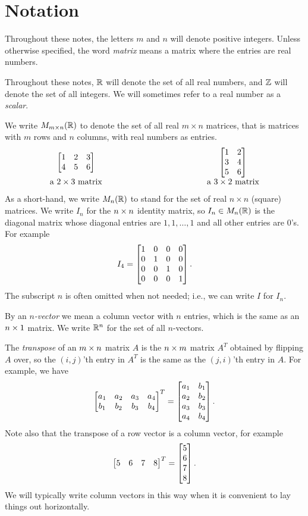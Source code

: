 \documentclass[reqno]{amsart}
\theoremstyle{definition}
\newcommand{\dfn}[1]{\emph{{#1}}\index{#1}}
\begin{document}
\section{Notation}
\label{sec-notation}

Throughout these notes, the letters $m$ and $n$ will denote positive
integers.  Unless otherwise specified, the word \dfn{matrix} means a
matrix where the entries are real numbers.

Throughout these notes, ${\mathbb{R}}$ will denote the set of all real numbers,
and ${\mathbb{Z}}$ will denote the set of all integers.  We will sometimes refer
to a real number as a \dfn{scalar}.

We write $M_{m\times n}({\mathbb{R}})$ to denote the set of all real $m\times n$
matrices, that is matrices with $m$ rows and $n$ columns, with real
numbers as entries.
\[
  \begin{array}{ccc}
   \bbm 1 & 2 & 3 \\ 4 & 5 & 6 \ebm &
   \hspace{10em} &
   \bbm 1 & 2 \\ 3 & 4 \\ 5 & 6 \ebm \\
   \text{ a $2\tm 3$ matrix } & &
   \text{ a $3\tm 2$ matrix }
  \end{array}
\]
As a short-hand, we write $M_n({\mathbb{R}})$ to stand for the set of real
$n\times n$ (square) matrices.  We write $I_n$ for the $n\times n$
identity matrix, so $I_n\in M_n({\mathbb{R}})$ is the diagonal matrix
whose diagonal entries are $1, 1, \ldots, 1$ and all other
entries are $0$'s.  For example
\[ I_4 = \left[\begin{matrix} 1 & 0 & 0 & 0 \\ 0 & 1 & 0 & 0 \\
              0 & 0 & 1 & 0 \\ 0 & 0 & 0 & 1 \end{matrix}\right].
\]
The subscript $n$ is often omitted when not needed; i.e., we
can write $I$ for $I_n$.

By an \emph{$n$-vector} we mean a column vector with
$n$ entries, which is the same as an $n\times 1$ matrix.  We write ${\mathbb{R}}^n$
for the set of all $n$-vectors.

The \dfn{transpose} of an $m\times n$ matrix $A$ is the
$n\times m$ matrix $A^T$ obtained by flipping $A$ over, so the $(i,j)$'th
entry in $A^T$ is the same as the $(j,i)$'th entry in $A$.  For
example, we have
\[ \left[\begin{matrix} a_1 & a_2 & a_3 & a_4 \\ b_1 & b_2 & b_3 & b_4 \end{matrix}\right]^T =
    \left[\begin{matrix} a_1 & b_1 \\ a_2 & b_2 \\ a_3 & b_3 \\ a_4 & b_4 \end{matrix}\right].
\]
Note also that the transpose of a row vector is a column vector, for
example
\[ \left[\begin{matrix} 5 & 6 & 7 & 8 \end{matrix}\right]^T = \left[\begin{matrix} 5 \\ 6 \\ 7 \\ 8 \end{matrix}\right]. \]
We will typically write column vectors in this way when it is
convenient to lay things out horizontally.
\end{document}

